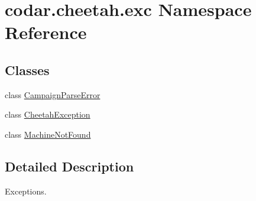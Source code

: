\hypertarget{namespacecodar_1_1cheetah_1_1exc}{}\section{codar.\+cheetah.\+exc Namespace Reference}
\label{namespacecodar_1_1cheetah_1_1exc}
\subsection*{Classes}
\begin{DoxyCompactItemize}
\item 
class \hyperlink{classcodar_1_1cheetah_1_1exc_1_1_campaign_parse_error}{Campaign\+Parse\+Error}
\item 
class \hyperlink{classcodar_1_1cheetah_1_1exc_1_1_cheetah_exception}{Cheetah\+Exception}
\item 
class \hyperlink{classcodar_1_1cheetah_1_1exc_1_1_machine_not_found}{Machine\+Not\+Found}
\end{DoxyCompactItemize}


\subsection{Detailed Description}
\begin{DoxyVerb}Exceptions.
\end{DoxyVerb}
 
